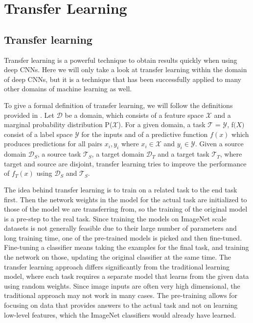 \chapter{Transfer Learning}

\section{Transfer learning}
Transfer learning is a powerful technique to obtain results quickly when using deep CNNs. Here we will only take a look at transfer learning within the domain of deep CNNs, but it is a technique that has been successfully applied to many other domains of machine learning as well.

To give a formal definition of transfer learning, we will follow the definitions provided in \citep{transferSurvey2010}. Let $\mathcal{D}$ be a domain, which consists of a feature space $\mathcal{X}$ and a marginal probability distribution P($\mathcal{X}$). For a given domain, a task $\mathcal{T}$ = {$\mathcal{Y}$, f$\mathcal(X)$} consist of a label space $\mathcal{Y}$ for the inputs and of a predictive function $f(x)$ which produces predictions for all pairs ${x_i, y_i}$ where $x_i \in \mathcal{X}$ and $y_i \in \mathcal{Y}$. Given a source domain $\mathcal{D}_S$, a source task $\mathcal{T}_S$, a target domain $\mathcal{D}_T$ and a target task $\mathcal{T}_T$, where target and source are disjoint, transfer learning tries to improve the performance of $f_T(x)$ using $\mathcal{D}_S$ and $\mathcal{T}_S$.

The idea behind transfer learning is to train on a related task to the end task first. Then the network weights in the model for the actual task are initialized to those of the model we are transferring from, so the training of the original model is a pre-step to the real task. Since training the models on ImageNet scale datasets is not generally feasible due to their large number of parameters and long training time, one of the pre-trained models is picked and then fine-tuned. Fine-tuning a classifier means taking the examples for the final task, and training the network on those, updating the original classifier at the same time. The transfer learning approach differs significantly from the traditional learning model, where each task requires a separate model that learns from the given data using random weights. Since image inputs are often very high dimensional, the traditional approach may not work in many cases. The pre-training allows for focusing on data that provides answers to the actual task and not on learning low-level features, which the ImageNet classifiers would already have learned.

